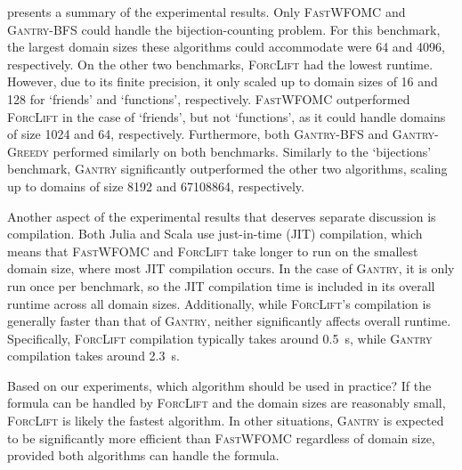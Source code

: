 \documentclass[a4paper,UKenglish,cleveref, autoref, thm-restate]{lipics-v2021}
\newcommand{\Cranetwo}{\textsc{Gantry}}
\newcommand{\Cranebfs}{\textsc{Gantry-BFS}}
\newcommand{\Cranegreedy}{\textsc{Gantry-Greedy}}
\begin{document}


 presents a summary of the experimental results. Only
\textsc{FastWFOMC} and \Cranebfs{} could handle the bijection-counting problem.
For this benchmark, the largest domain sizes these algorithms could accommodate
were \num{64} and \num{4096}, respectively. On the other two benchmarks,
\textsc{ForcLift} had the lowest runtime. However, due to its finite precision,
it only scaled up to domain sizes of \num{16} and \num{128} for `friends' and
`functions', respectively. \textsc{FastWFOMC} outperformed \textsc{ForcLift} in
the case of `friends', but not `functions', as it could handle domains of size
\num{1024} and \num{64}, respectively. Furthermore, both \Cranebfs{} and
\Cranegreedy{} performed similarly on both benchmarks. Similarly to the
`bijections' benchmark, \Cranetwo{} significantly outperformed the other two
algorithms, scaling up to domains of size \num{8192} and \num{67108864},
respectively.

Another aspect of the experimental results that deserves separate discussion is
compilation. Both Julia and Scala use just-in-time (JIT) compilation, which
means that \textsc{FastWFOMC} and \textsc{ForcLift} take longer to run on the
smallest domain size, where most JIT compilation occurs. In the case of
\Cranetwo{}, it is only run once per benchmark, so the JIT compilation time is
included in its overall runtime across all domain sizes. Additionally, while
\textsc{ForcLift}'s compilation is generally faster than that of \Cranetwo{},
neither significantly affects overall runtime. Specifically, \textsc{ForcLift}
compilation typically takes around \SI{0.5}{\second}, while \Cranetwo{}
compilation takes around \SI{2.3}{\second}.


Based on our experiments, which algorithm should be used in practice? If the
formula can be handled by \textsc{ForcLift} and the domain sizes are reasonably
small, \textsc{ForcLift} is likely the fastest algorithm. In other situations,
\Cranetwo{} is expected to be significantly more efficient than
\textsc{FastWFOMC} regardless of domain size, provided both algorithms can
handle the formula.
\end{document}
